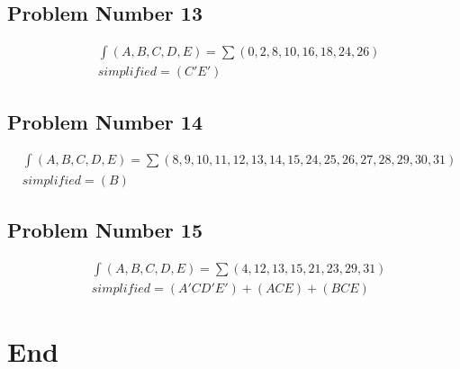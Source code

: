\subsection{Problem Number 13}
\begin{align}
\nonumber
&\int(A,B,C,D,E) = \sum(0,2,8,10,16,18,24,26) \\
\nonumber
&simplified = (C'E')
\end{align}

\subsection{Problem Number 14}
\begin{align}
\nonumber
&\int(A,B,C,D,E) = \sum(8,9,10,11,12,13,14,15,24,25,26,27,28,29,30,31) \\
\nonumber
&simplified = (B)
\end{align}

\subsection{Problem Number 15}
\begin{align}
\nonumber
&\int(A,B,C,D,E) = \sum(4,12,13,15,21,23,29,31) \\
\nonumber
&simplified = (A'CD'E') + (ACE) + (BCE)
\end{align}



\section{End}











